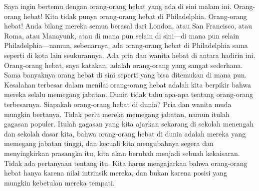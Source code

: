 \documentclass[
  letterpaper,
  DIV=11,
  numbers=noendperiod]{scrreprt}
\begin{document}
Saya ingin bertemu dengan orang-orang hebat yang ada di sini malam ini.
Orang-orang hebat! Kita tidak punya orang-orang hebat di Philadelphia.
Orang-orang hebat! Anda bilang mereka semua berasal dari London, atau
San Francisco, atau Roma, atau Manayunk, atau di mana pun selain di
sini---di mana pun selain Philadelphia---namun, sebenarnya, ada
orang-orang hebat di Philadelphia sama seperti di kota lain seukurannya.
Ada pria dan wanita hebat di antara hadirin ini. Orang-orang hebat, saya
katakan, adalah orang-orang yang sangat sederhana. Sama banyaknya orang
hebat di sini seperti yang bisa ditemukan di mana pun. Kesalahan
terbesar dalam menilai orang-orang hebat adalah kita berpikir bahwa
mereka selalu memegang jabatan. Dunia tidak tahu apa-apa tentang
orang-orang terbesarnya. Siapakah orang-orang hebat di dunia? Pria dan
wanita muda mungkin bertanya. Tidak perlu mereka memegang jabatan, namun
itulah gagasan populer. Itulah gagasan yang kita ajarkan sekarang di
sekolah menengah dan sekolah dasar kita, bahwa orang-orang hebat di
dunia adalah mereka yang memegang jabatan tinggi, dan kecuali kita
mengubahnya segera dan menyingkirkan prasangka itu, kita akan berubah
menjadi sebuah kekaisaran. Tidak ada pertanyaan tentang itu. Kita harus
mengajarkan bahwa orang-orang hebat hanya karena nilai intrinsik mereka,
dan bukan karena posisi yang mungkin kebetulan mereka tempati.
\end{document}
